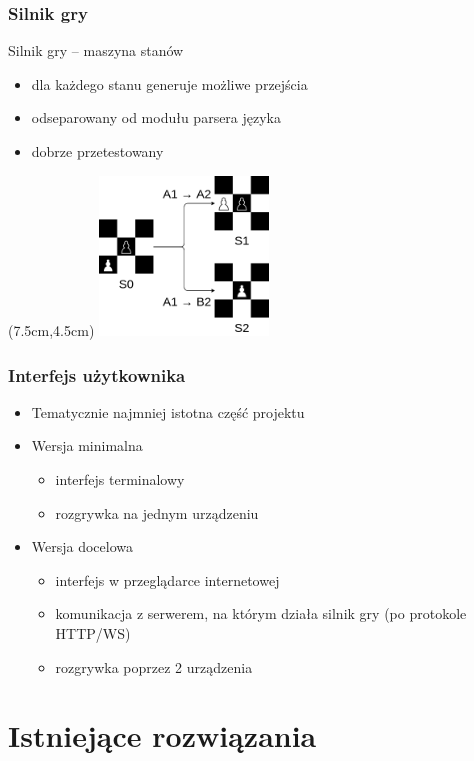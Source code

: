 \documentclass{beamer}
\begin{document}
\begin{frame}[t]
	\vspace{0.7cm}
	\frametitle{Silnik gry}
	Silnik gry -- maszyna stanów
	\begin{itemize}
		\item dla każdego stanu generuje możliwe przejścia
		\item odseparowany od modułu parsera języka
		\item dobrze przetestowany
	\end{itemize}
	\begin{textblock*}{5cm}(7.5cm,4.5cm)
		\includegraphics[width=4.5cm]{stany.png}
	\end{textblock*}
\end{frame}

\begin{frame}
	\frametitle{Interfejs użytkownika}
	\begin{itemize}
		\item Tematycznie najmniej istotna część projektu
		\item Wersja minimalna
		      \begin{itemize}
			      \item interfejs terminalowy
			      \item rozgrywka na jednym urządzeniu
		      \end{itemize}
		\item Wersja docelowa
		      \begin{itemize}
			      \item interfejs w przeglądarce internetowej
			      \item komunikacja z serwerem, na którym działa silnik gry (po protokole HTTP/WS)
			      \item rozgrywka poprzez 2 urządzenia
		      \end{itemize}
	\end{itemize}
\end{frame}


\section{Istniejące rozwiązania}
\end{document}
